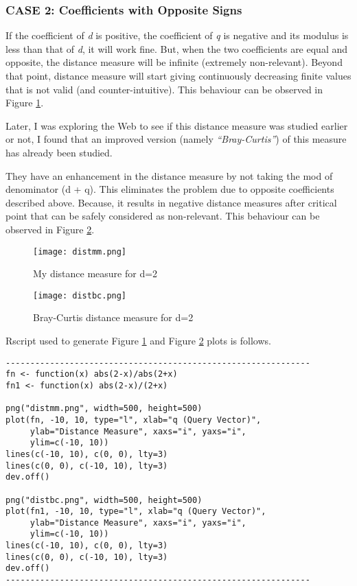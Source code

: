 \documentclass[letterpaper,12pt]{article}
\begin{document}
\subsubsection{CASE 2: Coefficients with Opposite Signs}

If the coefficient of \emph{d} is positive, the coefficient of \emph{q} is negative and its modulus is less than that of \emph{d}, it will work fine. But, when the two coefficients are equal and opposite, the distance measure will be infinite (extremely non-relevant). Beyond that point, distance measure will start giving continuously decreasing finite values that is not valid (and counter-intuitive). This behaviour can be observed in Figure \ref{distmm}.

Later, I was exploring the Web to see if this distance measure was studied earlier or not, I found that an improved version (namely \emph{``Bray-Curtis''}) of this measure has already been studied.\cite{bray1957ordination}\cite{celebi2010alternative}

They have an enhancement in the distance measure by not taking the mod of denominator (d + q). This eliminates the problem due to opposite coefficients described above. Because, it results in negative distance measures after critical point that can be safely considered as non-relevant. This behaviour can be observed in Figure \ref{distbc}.


\begin{figure}[htp]
\centering
\texttt{[image: distmm.png]}
\caption{My distance measure for d=2}
\label{distmm}
\end{figure}

\begin{figure}[htp]
\centering
\texttt{[image: distbc.png]}
\caption{Bray-Curtis distance measure for d=2}
\label{distbc}
\end{figure}


Rscript used to generate Figure \ref{distmm} and Figure \ref{distbc} plots is follows.

\begin{verbatim}
--------------------------------------------------------------
fn <- function(x) abs(2-x)/abs(2+x)
fn1 <- function(x) abs(2-x)/(2+x)

png("distmm.png", width=500, height=500)
plot(fn, -10, 10, type="l", xlab="q (Query Vector)",
     ylab="Distance Measure", xaxs="i", yaxs="i",
     ylim=c(-10, 10))
lines(c(-10, 10), c(0, 0), lty=3)
lines(c(0, 0), c(-10, 10), lty=3)
dev.off()

png("distbc.png", width=500, height=500)
plot(fn1, -10, 10, type="l", xlab="q (Query Vector)",
     ylab="Distance Measure", xaxs="i", yaxs="i",
     ylim=c(-10, 10))
lines(c(-10, 10), c(0, 0), lty=3)
lines(c(0, 0), c(-10, 10), lty=3)
dev.off()
--------------------------------------------------------------
\end{verbatim}
\end{document}

